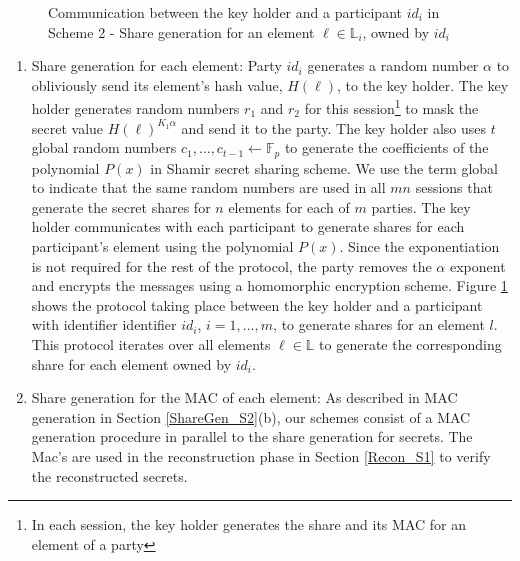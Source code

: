 \begin{figure}[h!]
   \caption{Communication between the key holder and a participant $id_i$ in Scheme 2 - Share generation for an element $\ell \in \mathbb{L}_i$, owned by $id_i$}
   \label{fig:S1_ShareGen}
\end{figure}
\begin{enumerate}[label=(\alph*)]
    \item Share generation for each element: Party $id_i$ generates a random number $\alpha$ to obliviously send its element's hash value, $H(\ell)$, to the key holder. The key holder generates random numbers $r_1$ and $r_2$ for this session\footnote{In each session, the key holder generates the share and its MAC for an element of a party} to mask the secret value $H(\ell)^{K_1 \alpha}$ and send it to the party. The key holder also uses $t$ global random numbers $c_1, \dots, c_{t-1} \gets \mathbb{F}_p$ to generate the coefficients of the polynomial $P(x)$ in Shamir secret sharing scheme. We use the term global to indicate that the same random numbers are used in all $mn$ sessions that generate the secret shares for $n$ elements for each of $m$ parties. The key holder communicates with each participant to generate shares for each participant's element using the polynomial $P(x)$. Since the exponentiation is not required for the rest of the protocol, the party removes the $\alpha$ exponent and encrypts the messages using a homomorphic encryption scheme. Figure \ref{fig:S1_ShareGen} shows the protocol taking place between the key holder and a participant with identifier identifier $id_i$, $i =1, \dots, m$, to generate shares for an element $l$. This protocol iterates over all elements $\ell \in \mathbb{L}$ to generate the corresponding share for each element owned by $id_i$.
    \item Share generation for the MAC of each element: As described in MAC generation in Section \ref{ShareGen_S2}(b), our schemes consist of a MAC generation procedure in parallel to the share generation for secrets. The Mac's are used in the reconstruction phase in Section \ref{Recon_S1} to verify the reconstructed secrets. 
\end{enumerate}

